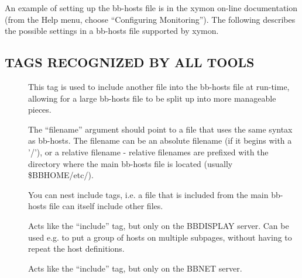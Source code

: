   An example of setting up the bb-hosts file is in the xymon on-line
  documentation (from the Help menu, choose ``Configuring
  Monitoring''). The following describes the possible settings in a
  bb-hosts file supported by xymon. 


 
\subsection{TAGS RECOGNIZED BY ALL TOOLS}


 \begin{description}
\item[] This tag is used to include another file into
  the bb-hosts file at run-time, allowing for a large bb-hosts file to
  be split up into more manageable pieces. 


  The ``filename'' argument should point to a file that uses the same
  syntax as bb-hosts. The filename can be an absolute filename (if it
  begins with a '/'), or a relative filename - relative filenames are
  prefixed with the directory where the main bb-hosts file is located
  (usually \$BBHOME/etc/). 



  You can nest include tags, i.e. a file that is included from the
  main bb-hosts file can itself include other files. 



 

\item[] Acts like the ``include'' tag, but only on
  the BBDISPLAY server. Can be used e.g. to put a group of hosts on
  multiple subpages, without having to repeat the host definitions. 


 

\item[] Acts like the ``include'' tag, but only on the BBNET server. 

 


 


\end{description}

